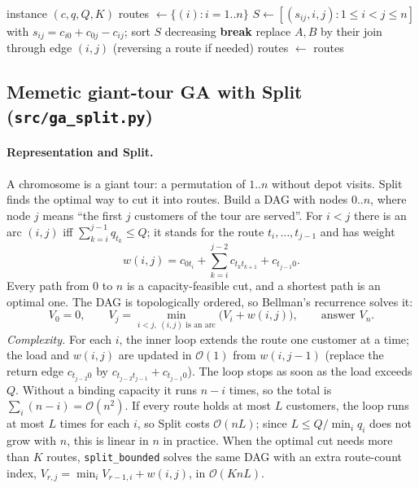 \documentclass[11pt,a4paper]{article}
\theoremstyle{definition}
\theoremstyle{remark}
\newcommand{\code}[1]{\texttt{#1}}
\newcommand{\Ocal}{\mathcal{O}}
\begin{document}
\begin{algorithm}[ht]
\caption{Clarke--Wright savings with fleet repair}\label{alg:cw}
\begin{algorithmic}[1]
\Require instance $(c,q,Q,K)$
\State routes $\gets \{(i) : i=1..n\}$ 
\State $S\gets [(s_{ij},i,j) : 1\le i<j\le n]$ with $s_{ij}=c_{i0}+c_{0j}-c_{ij}$; sort $S$ decreasing
   \textbf{break} \EndIf
    \State replace $A,B$ by their join through edge $(i,j)$ (reversing a route if needed)
  \EndIf
\EndFor
{} \State routes $\gets$  \EndIf
\State \Return routes
\end{algorithmic}
\end{algorithm}

\subsection{Memetic giant-tour GA with Split (\code{src/ga\_split.py})}
\paragraph{Representation and Split.} A chromosome is a giant tour: a permutation of
$1..n$ without depot visits. Split~\cite{prins2004} finds the optimal way to cut it into
routes. Build a DAG with nodes $0..n$, where node $j$ means ``the first $j$ customers of the
tour are served''. For $i<j$ there is an arc $(i,j)$ iff $\sum_{k=i}^{j-1} q_{t_k}\le Q$; it
stands for the route $t_i,\dots,t_{j-1}$ and has weight
\[
w(i,j) = c_{0t_i} + \textstyle\sum_{k=i}^{j-2} c_{t_kt_{k+1}} + c_{t_{j-1}0}.
\]
Every path from $0$ to $n$ is a capacity-feasible cut, and a shortest path is an optimal
one. The DAG is topologically ordered, so Bellman's recurrence solves it:
\[
V_0 = 0, \qquad V_j = \min_{i<j,\ (i,j)\text{ is an arc}} \big(V_i + w(i,j)\big),\qquad
\text{answer } V_n .
\]
\emph{Complexity.} For each $i$, the inner loop extends the route one customer at a time;
the load and $w(i,j)$ are updated in $\Ocal(1)$ from $w(i,j-1)$ (replace the return edge
$c_{t_{j-2}0}$ by $c_{t_{j-2}t_{j-1}}+c_{t_{j-1}0}$). The loop stops as soon as the load
exceeds $Q$. Without a binding capacity it runs $n-i$ times, so the total is
$\sum_i (n-i)=\Ocal(n^2)$. If every route holds at most $L$ customers, the loop runs at
most $L$ times for each $i$, so Split costs $\Ocal(nL)$; since $L\le Q/\min_i q_i$ does not
grow with $n$, this is linear in $n$ in practice. When the optimal cut needs more than $K$
routes, \code{split\_bounded} solves the same DAG with an extra route-count index,
$V_{r,j}=\min_i V_{r-1,i}+w(i,j)$, in $\Ocal(KnL)$.
\end{document}
